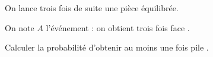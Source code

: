 \begin{exo}
	On lance trois fois de suite une pièce équilibrée.

	On note $A$ l'événement : \og{} on obtient trois fois face \fg{}.

	Calculer la probabilité d'obtenir au moins une fois \og{} pile \fg{}.
\end{exo}

